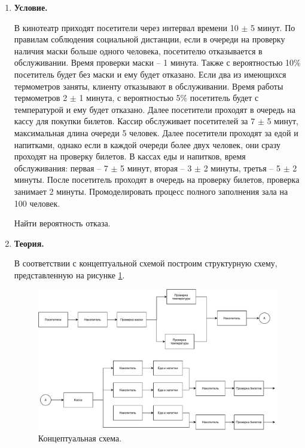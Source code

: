 \documentclass[a4paper,14pt]{extreport} %
\begin{document}
\begin{enumerate}

\item \textbf{Условие. }

В кинотеатр приходят посетители через интервал времени 10 $\pm$ 5 минут. По правилам соблюдения социальной дистанции, если в очереди на проверку наличия маски больше одного человека, посетителю отказывается в обслуживании. Время проверки маски -- 1 минута. Также с вероятностью 10\% посетитель будет без маски и ему будет отказано. Если два из имеющихся термометров заняты, клиенту отказывают в обслуживании. Время работы термометров 2 $\pm$ 1 минута, с вероятностью 5\% посетитель будет с температурой и ему будет отказано. Далее посетители проходят  в очередь на кассу для покупки билетов. Кассир обслуживает посетителей за 7 $\pm$ 5 минут, максимальная длина очереди 5 человек.  Далее посетители проходят за едой и напитками, однако если в каждой очереди более двух человек, они сразу проходят на проверку билетов.  В кассах еды и напитков, время обслуживания: первая -- 7 $\pm$ 5 минут, вторая -- 3 $\pm$ 2 минуты, третья -- 5 $\pm$ 2 минуты. После посетитель проходят в очередь на проверку билетов, проверка занимает 2 минуты. Промоделировать процесс полного заполнения зала на 100 человек. 

Найти вероятность отказа. 

\item \textbf{Теория. }

В соответствии с концептуальной схемой построим структурную схему, представленную на рисунке \ref{model}. 

\begin{figure}[H]
  \centering
  \includegraphics[scale=0.75]{model}
  \caption{Концептуальная схема.  }
  \label{model}
\end{figure}


\end{enumerate}
\end{document}
